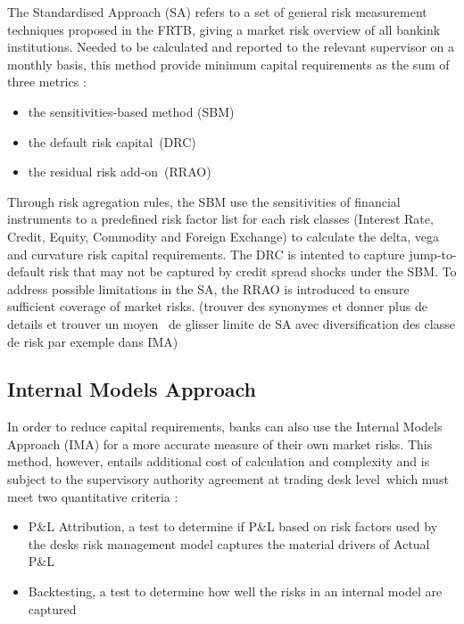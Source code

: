 \documentclass[3pt]{article}
\begin{document}
The Standardised Approach (SA) refers to a set of general risk measurement
techniques proposed in the FRTB, giving a market risk overview of all
bankink institutions. Needed to be calculated and reported to the relevant
supervisor on a monthly basis, this method provide minimum capital
requirements as the sum of three metrics :

\bigskip

\begin{itemize}
\item the sensitivities-based method (SBM)

\item the default risk capital\ (DRC)

\item the residual risk add-on\ (RRAO)
\end{itemize}

\bigskip

Through risk agregation rules, the SBM use the sensitivities of financial
instruments to a predefined risk factor list for each risk classes (Interest
Rate, Credit, Equity, Commodity and Foreign Exchange) to calculate the
delta, vega and curvature risk capital requirements. The DRC is intented to
capture jump-to-default risk that may not be captured by credit spread
shocks under the SBM. To address possible limitations in the SA, the RRAO is
introduced to ensure sufficient coverage of market risks. (trouver des
synonymes et donner plus de details et trouver un moyen \ de glisser limite
de SA avec diversification des classe de risk par exemple dans IMA)

\subsection{Internal Models Approach}

In order to reduce capital requirements, banks can also use the Internal
Models Approach (IMA) for a more accurate measure of their own market risks.
This method, however, entails additional cost of calculation and complexity
and is subject to the supervisory authority agreement at trading desk level\
which must meet two quantitative criteria :

\bigskip

\begin{itemize}
\item P\&L Attribution, a test to determine if P\&L based on risk factors
used by the desks risk management model captures the material drivers of
Actual P\&L

\item Backtesting, a test to determine how well the risks in an internal
model are captured
\end{itemize}
\end{document}
